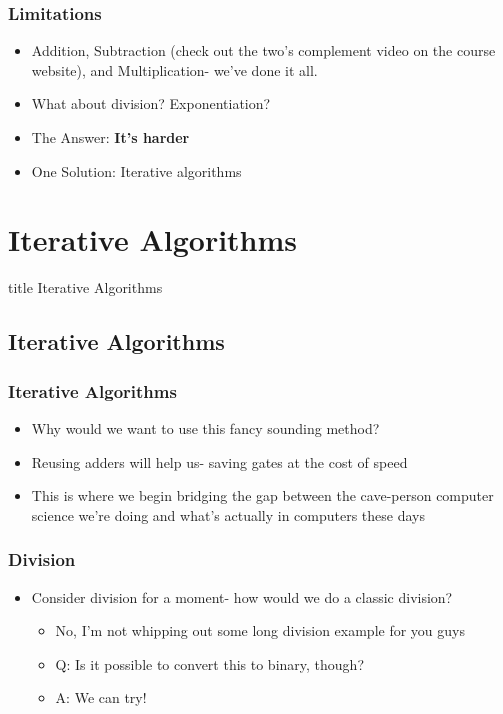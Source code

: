 \documentclass{beamer}
\begin{document}
    	\begin{frame}
    		\frametitle{Limitations}
    		\begin{itemize}
    			\item Addition, Subtraction (check out the two's complement video on the course website), and Multiplication- we've done it all.
    			\item What about division? Exponentiation?
    			\item The Answer: \textbf{It's harder}
    			\item One Solution: Iterative algorithms
    		\end{itemize}
    	\end{frame}
    	
		\section{Iterative Algorithms}    	
    	
    	\begin{frame}
                \vfill
                \centering
                \begin{beamercolorbox}[sep=8pt,center,shadow=true,rounded=true]{title}
                    Iterative Algorithms\par%
                \end{beamercolorbox}
                \vfill
             \end{frame}
             
    	
    	\subsection{Iterative Algorithms}
    	
    	\begin{frame}
    		\frametitle{Iterative Algorithms}
    		\begin{itemize}
    			\item Why would we want to use this fancy sounding method?
    			\item Reusing adders will help us- saving gates at the cost of speed
    			\item This is where we begin bridging the gap between the cave-person computer science we're doing and what's actually in computers these days
    		\end{itemize}
    	\end{frame}
    	
    	\begin{frame}
    		\frametitle{Division}
    		\begin{itemize}
    			\item Consider division for a moment- how would we do a classic division?
    			\begin{itemize}
    				\item No, I'm not whipping out some long division example for you guys
    				\item Q: Is it possible to convert this to binary, though?
    				\item A: We can try!
    			\end{itemize}
    		\end{itemize}
    	\end{frame}
    	
   
    
\end{document}

